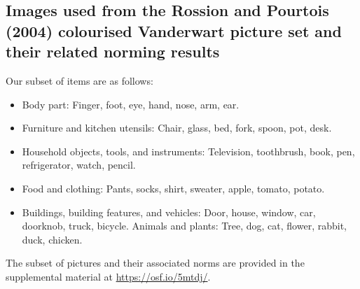 \clearpage



\begin{appendix}
\section{}
\hypertarget{appendix-d}{%
\subsection{Images used from the Rossion and Pourtois (2004) colourised
Vanderwart picture set and their related norming
results}\label{appendix-d}}

Our subset of items are as follows:

\begin{itemize}
\item
  Body part: Finger, foot, eye, hand, nose, arm, ear.
\item
  Furniture and kitchen utensils: Chair, glass, bed, fork, spoon, pot,
  desk.
\item
  Household objects, tools, and instruments: Television, toothbrush,
  book, pen, refrigerator, watch, pencil.
\item
  Food and clothing: Pants, socks, shirt, sweater, apple, tomato,
  potato.
\item
  Buildings, building features, and vehicles: Door, house, window, car,
  doorknob, truck, bicycle. Animals and plants: Tree, dog, cat, flower,
  rabbit, duck, chicken.
\end{itemize}

The subset of pictures and their associated norms are provided in the
supplemental material at \url{https://osf.io/5mtdj/}.
\end{appendix}
